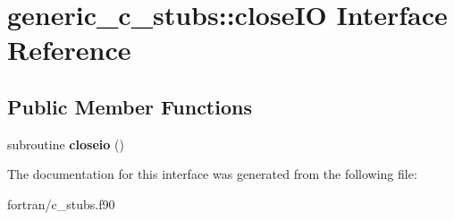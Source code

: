 \hypertarget{interfacegeneric__c__stubs_1_1close_i_o}{}\section{generic\+\_\+c\+\_\+stubs\+:\+:close\+IO Interface Reference}
\label{interfacegeneric__c__stubs_1_1close_i_o}
\subsection*{Public Member Functions}
\begin{DoxyCompactItemize}
\item 
\mbox{\label{interfacegeneric__c__stubs_1_1close_i_o_ab34de3ed715894c19b04cbbeffc2118b}} 
subroutine {\bfseries closeio} ()
\end{DoxyCompactItemize}


The documentation for this interface was generated from the following file\+:\begin{DoxyCompactItemize}
\item 
fortran/c\+\_\+stubs.\+f90\end{DoxyCompactItemize}
